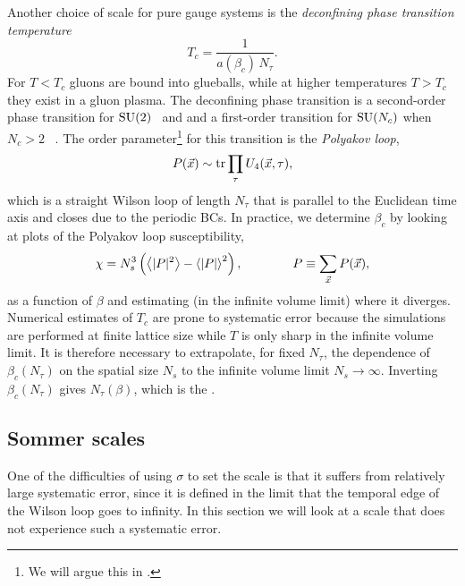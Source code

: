 Another choice of scale for pure gauge systems is the 
{\it deconfining phase transition temperature}
\begin{equation}
  T_c=\frac{1}{a(\beta_c)\,N_\tau}.
\end{equation}
For $T<T_c$ gluons are bound into  glueballs, while 
at higher temperatures $T>T_c$ they exist in a gluon plasma. 
The deconfining phase transition is a second-order phase transition for 
$\operatorname{SU}(2)$~\cite{engels_critical_1996} and
and a first-order transition for $\operatorname{SU}(N_c)$ when $N_c>2$
~\cite{svetitsky_critical_1982}. 
The order parameter\footnote{We will argue this in .} 
for this transition is the 
{\it Polyakov loop},
\begin{equation}
  P(\vec{x})\sim\tr\prod_\tau U_4(\vec{x},\tau),
\end{equation}
which is a straight Wilson loop of length $N_\tau$ that is 
parallel to the Euclidean time 
axis and closes due to the periodic BCs. 
In practice, 
we determine $\beta_c$ by looking at plots of the Polyakov loop 
susceptibility,
\begin{equation}
  \chi=N_s^3\left(\ev{|P|^2}-\ev{|P|}^2\right), \qquad\qquad 
    P\equiv\sum\limits_{\vec{x}}P(\vec{x}),
\end{equation}
as a function of $\beta$ and estimating (in the infinite volume limit)
where it diverges. Numerical estimates
of $T_c$ are prone to systematic error because the simulations are
performed at finite lattice size while $T$ is only sharp in the infinite
volume limit. It is therefore necessary to extrapolate, for fixed $N_{\tau}$,
the dependence of $\beta_c(N_\tau)$ on the spatial size $N_s$ to the
infinite volume limit $N_s\to\infty$. Inverting $\beta_c(N_\tau)$ gives
$N_\tau(\beta)$, which is the 
.


\subsection{Sommer scales}

One of the difficulties of using $\sigma$ to set the scale is that it suffers
from relatively large systematic error, since it is defined in the limit that
the temporal edge of the Wilson loop goes to infinity.
In this section we will look at a scale that does not experience such a
systematic error.

